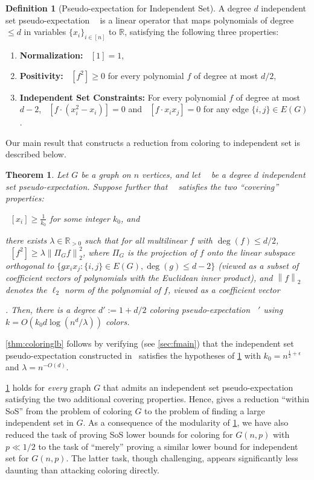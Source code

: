 \documentclass[10pt,a4paper]{article}
\newtheorem{mtheorem}{Theorem}
\theoremstyle{definition}
\newtheorem{definition}[theorem]{Definition}
\newcommand{\R}{\mathbb R}
\newcommand{\eps}{\epsilon}
\DeclareMathOperator{\pE}{\tilde{\mathbb{E}}}
\def\norm#1{\left\| #1 \right\|}
\newcommand{\numcolors}{k}
\newcommand{\numlb}{k_0}
\begin{document}
\begin{definition}[Pseudo-expectation for Independent Set]
A degree $d$ independent set pseudo-expectation $\pE$ is a linear operator that maps polynomials of degree $\leq d$ in variables $\{x_i\}_{i \in[n]}$ to $\R$, satisfying the following three properties:
\begin{enumerate}
	\item \textbf{Normalization: } $\pE[1]  = 1$,
	\item \textbf{Positivity: } $\pE[f^2] \geq 0$ for every polynomial $f$ of degree at most $d/2$,
	\item \textbf{Independent Set Constraints:} For every polynomial $f$ of degree at most $d-2$, $\pE[f \cdot (x_{i}^2 - x_{i})] = 0$ and $\pE[f \cdot x_{i} x_{j}] = 0$ for any edge $\{i,j\} \in E(G)$.
	\end{enumerate}
\end{definition}

Our main result that constructs a reduction from coloring to independent set is described below.
\begin{mtheorem}
\label{thm:reduction}
Let $G$ be a graph on $n$ vertices, and let $\pE$ be a degree $d$ independent set pseudo-expectation. Suppose further that $\pE$ satisfies the two ``covering'' properties: \begin{inparaenum}[(1)] \item $\pE[x_i] \geq \frac{1}{\numlb}$ for some integer $\numlb$, and \item there exists $\lambda \in \R_{> 0}$ such that for all multilinear $f$ with $\deg(f) \leq d/2$, $\pE[f^2] \geq \lambda \norm{\Pi_G f}_2^2$, where $\Pi_G$ is the projection of $f$ onto the linear subspace orthogonal to $\{g x_i x_j : \{i,j\} \in E(G), \deg(g) \leq d-2\}$ (viewed as a subset of coefficient vectors of polynomials with the Euclidean inner product), and $\norm{f}_2$ denotes the $\ell_2$ norm of the polynomial of $f$, viewed as a coefficient vector\end{inparaenum}. 
Then, there is a degree $d' := 1 + d/2$ coloring pseudo-expectation $\pE'$ using $\numcolors = O(\numlb d \log (n^d/\lambda))$ colors.
\end{mtheorem}
\cref{thm:coloringlb} follows by verifying (see \cref{sec:fmain}) that the independent set pseudo-expectation constructed in~\cite{DBLP:conf/focs/BarakHKKMP16} satisfies the hypotheses of \cref{thm:reduction} with $\numlb = n^{\frac{1}{2} + \eps}$ and $\lambda = n^{-O(d)}$.

\cref{thm:reduction} holds for \emph{every} graph $G$ that admits an independent set pseudo-expectation satisfying the two additional covering properties. Hence,  gives a reduction ``within SoS'' from the problem of coloring $G$ to the problem of finding a large independent set in $G$. As a consequence of the modularity of \cref{thm:reduction}, we have also reduced the task of proving SoS lower bounds for coloring for $G(n,p)$ with $p \ll 1/2$ to the task of ``merely'' proving a similar lower bound for independent set for $G(n,p)$. The latter task, though challenging, appears significantly less daunting than attacking coloring directly. 
\end{document}
